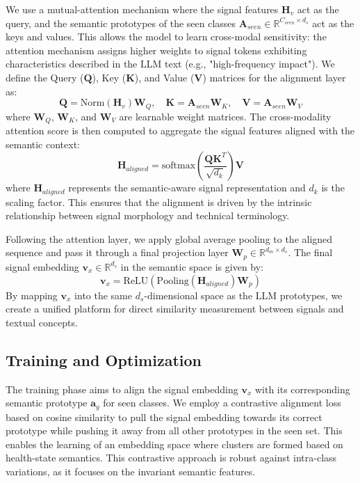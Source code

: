 \documentclass[journal]{IEEEtran}
\begin{document}
We use a mutual-attention mechanism where the signal features $\mathbf{H}_v$ act as the query, and the semantic prototypes of the seen classes $\mathbf{A}_{seen} \in \mathbb{R}^{C_{seen} \times d_s}$ act as the keys and values. This allows the model to learn cross-modal sensitivity: the attention mechanism assigns higher weights to signal tokens exhibiting characteristics described in the LLM text (e.g., "high-frequency impact"). We define the Query ($\mathbf{Q}$), Key ($\mathbf{K}$), and Value ($\mathbf{V}$) matrices for the alignment layer as:
\begin{equation}
\mathbf{Q} = \text{Norm}(\mathbf{H}_v) \mathbf{W}_Q, \quad \mathbf{K} = \mathbf{A}_{seen} \mathbf{W}_K, \quad \mathbf{V} = \mathbf{A}_{seen} \mathbf{W}_V
\end{equation}
where $\mathbf{W}_Q$, $\mathbf{W}_K$, and $\mathbf{W}_V$ are learnable weight matrices. The cross-modality attention score is then computed to aggregate the signal features aligned with the semantic context:
\begin{equation}
\mathbf{H}_{aligned} = \text{softmax}\left(\frac{\mathbf{Q}\mathbf{K}^T}{\sqrt{d_k}}\right) \mathbf{V}
\end{equation}
where $\mathbf{H}_{aligned}$ represents the semantic-aware signal representation and $d_k$ is the scaling factor. This ensures that the alignment is driven by the intrinsic relationship between signal morphology and technical terminology.

Following the attention layer, we apply global average pooling to the aligned sequence and pass it through a final projection layer $\mathbf{W}_p \in \mathbb{R}^{d_m \times d_s}$. The final signal embedding $\mathbf{v}_x \in \mathbb{R}^{d_s}$ in the semantic space is given by:
\begin{equation}
\mathbf{v}_x = \text{ReLU}(\text{Pooling}(\mathbf{H}_{aligned}) \mathbf{W}_p)
\end{equation}
By mapping $\mathbf{v}_x$ into the same $d_s$-dimensional space as the LLM prototypes, we create a unified platform for direct similarity measurement between signals and textual concepts.

\subsection{Training and Optimization}
The training phase aims to align the signal embedding $\mathbf{v}_x$ with its corresponding semantic prototype $\mathbf{a}_{y}$ for seen classes. We employ a contrastive alignment loss \cite{chen2020simple} based on cosine similarity to pull the signal embedding towards its correct prototype while pushing it away from all other prototypes in the seen set. This enables the learning of an embedding space where clusters are formed based on health-state semantics. This contrastive approach is robust against intra-class variations, as it focuses on the invariant semantic features.
\end{document}
